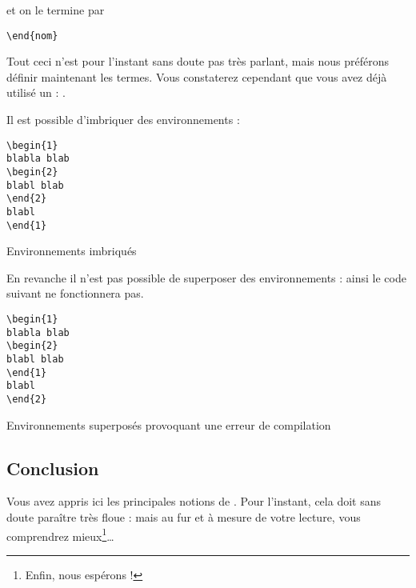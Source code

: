et on le termine par 
\begin{verbatim}
\end{nom}
\end{verbatim}

Tout ceci n'est  pour l'instant sans doute pas très parlant, mais nous préférons définir maintenant les termes. Vous constaterez cependant que vous avez déjà utilisé  un  : .


Il est possible d'imbriquer des environnements :
\begin{listing}[ht]
\begin{verbatim}
\begin{1}
blabla blab
\begin{2}
blabl blab
\end{2}
blabl
\end{1}
\end{verbatim}
\caption{Environnements imbriqués}
\end{listing}
\FloatBarrier
En revanche il n'est pas possible de superposer des environnements : ainsi le code suivant ne fonctionnera pas.

\begin{listing}[ht]
\begin{verbatim}
\begin{1}
blabla blab
\begin{2}
blabl blab
\end{1}
blabl
\end{2}
\end{verbatim}
\caption{Environnements superposés provoquant une erreur de compilation}
\end{listing}
\FloatBarrier
\subsection{Conclusion}

Vous avez appris ici les principales notions de \logiciel{\LaTeX}. Pour l'instant, cela doit sans doute paraître très floue : mais au fur et à mesure de votre lecture, vous comprendrez mieux\footnote{Enfin, nous espérons !}\ldots


